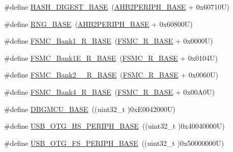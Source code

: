 \begin{DoxyCompactItemize}
\item 
\#define \hyperlink{group___peripheral__registers__structures_ga41efdf0e6db11dad3003d01882ee8bcb}{H\+A\+S\+H\+\_\+\+D\+I\+G\+E\+S\+T\+\_\+\+B\+A\+SE}~(\hyperlink{group___peripheral__memory__map_gaeedaa71d22a1948492365e2cd26cfd46}{A\+H\+B2\+P\+E\+R\+I\+P\+H\+\_\+\+B\+A\+SE} + 0x60710\+U)
\item 
\#define \hyperlink{group___peripheral__registers__structures_gab92662976cfe62457141e5b4f83d541c}{R\+N\+G\+\_\+\+B\+A\+SE}~(\hyperlink{group___peripheral__memory__map_gaeedaa71d22a1948492365e2cd26cfd46}{A\+H\+B2\+P\+E\+R\+I\+P\+H\+\_\+\+B\+A\+SE} + 0x60800\+U)
\item 
\#define \hyperlink{group___peripheral__registers__structures_gad196fe6f5e4041b201d14f43508c06d2}{F\+S\+M\+C\+\_\+\+Bank1\+\_\+\+R\+\_\+\+B\+A\+SE}~(\hyperlink{group___peripheral__registers__structures_gaddf0e199dccba83272b20c9fb4d3aaed}{F\+S\+M\+C\+\_\+\+R\+\_\+\+B\+A\+SE} + 0x0000\+U)
\item 
\#define \hyperlink{group___peripheral__registers__structures_gaea182589c84aee30b7f735474d8774e2}{F\+S\+M\+C\+\_\+\+Bank1\+E\+\_\+\+R\+\_\+\+B\+A\+SE}~(\hyperlink{group___peripheral__registers__structures_gaddf0e199dccba83272b20c9fb4d3aaed}{F\+S\+M\+C\+\_\+\+R\+\_\+\+B\+A\+SE} + 0x0104\+U)
\item 
\#define \hyperlink{group___peripheral__registers__structures_ga851707a200f63e03c336073706fdce1d}{F\+S\+M\+C\+\_\+\+Bank2\+\_\+\_\+\+R\+\_\+\+B\+A\+SE}~(\hyperlink{group___peripheral__registers__structures_gaddf0e199dccba83272b20c9fb4d3aaed}{F\+S\+M\+C\+\_\+\+R\+\_\+\+B\+A\+SE} + 0x0060\+U)
\item 
\#define \hyperlink{group___peripheral__registers__structures_gaf9e5417133160b0bdd0498d982acec19}{F\+S\+M\+C\+\_\+\+Bank4\+\_\+\+R\+\_\+\+B\+A\+SE}~(\hyperlink{group___peripheral__registers__structures_gaddf0e199dccba83272b20c9fb4d3aaed}{F\+S\+M\+C\+\_\+\+R\+\_\+\+B\+A\+SE} + 0x00\+A0\+U)
\item 
\#define \hyperlink{group___peripheral__registers__structures_ga4adaf4fd82ccc3a538f1f27a70cdbbef}{D\+B\+G\+M\+C\+U\+\_\+\+B\+A\+SE}~((uint32\+\_\+t )0x\+E0042000\+U)
\item 
\#define \hyperlink{group___peripheral__registers__structures_gaa405d2ebfd7e9394237b6639f16a5409}{U\+S\+B\+\_\+\+O\+T\+G\+\_\+\+H\+S\+\_\+\+P\+E\+R\+I\+P\+H\+\_\+\+B\+A\+SE}~((uint32\+\_\+t )0x40040000\+U)
\item 
\#define \hyperlink{group___peripheral__registers__structures_gaa86d4c80849a74938924e73937b904e7}{U\+S\+B\+\_\+\+O\+T\+G\+\_\+\+F\+S\+\_\+\+P\+E\+R\+I\+P\+H\+\_\+\+B\+A\+SE}~((uint32\+\_\+t )0x50000000\+U)

\end{DoxyCompactItemize}
